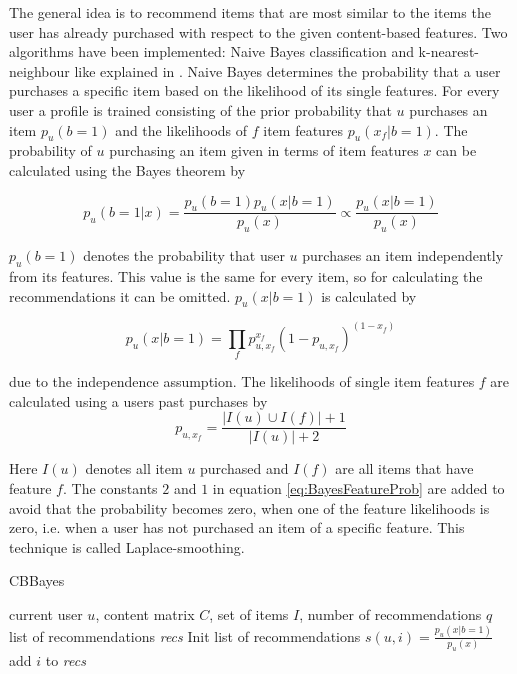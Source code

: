 \documentclass[10pt]{reportMaster}
\begin{document}
The general idea is to recommend items that are most similar to the items the user has already purchased with respect to the given content-based features.
Two algorithms have been implemented: Naive Bayes classification and k-nearest-neighbour like explained in \cite{contentbasedPazzani}.
Naive Bayes determines the probability that a user purchases a specific item based on the likelihood of its single features.
For every user a profile is trained consisting of the prior probability that $u$ purchases an item $p_u(b=1)$ and  the likelihoods of $f$ item features $p_u(x_f|b=1)$.
The probability of $u$ purchasing an item given in terms of item features $x$ can be calculated using the Bayes theorem by 

\begin{equation}
\label{BayesPost}
	p_u(b=1|x) = \frac{p_u(b=1) p_u(x|b=1)}{p_u(x)} \propto \frac{p_u(x|b=1)}{p_u(x)}
\end{equation}

$p_u(b=1)$ denotes the probability that user $u$ purchases an item independently from its features.
This value is the same for every item, so for calculating the recommendations it can be omitted.
$p_u(x|b=1)$ is calculated by 

\begin{equation}
\label{BayesEvid}
p_u(x|b=1) = \prod_f{p_{u, x_f}^{x_f}(1-p_{u, x_f})^{(1-x_f)}}
\end{equation}

due to the independence assumption.
The likelihoods of single item features $f$ are calculated using a users past purchases by
\begin{equation}
\label{eq:BayesFeatureProb}
p_{u, x_f} = \frac{|I(u) \cup I(f)|+1}{|I(u)|+2}
\end{equation}

Here $I(u)$ denotes all item $u$ purchased and $I(f)$ are all items that have feature $f$.
The constants $2$ and $1$ in equation \ref{eq:BayesFeatureProb} are added to avoid that the probability becomes zero, when one of the feature likelihoods is zero, i.e. when a user has not purchased an item of a specific feature.
This technique is called Laplace-smoothing.

\begin{algorithm}
	\caption{CBBayes}
	\label{alg:CBBayes}
	\begin{algorithmic}[1]
		\Require current user $u$, content matrix $C$, set of items $I$, number of recommendations $q$
		\Ensure list of recommendations \textit{recs}
		\State Init list of recommendations 
			\State 	$s(u,i) = \frac{p_u(x|b=1)}{p_u(x)}$
				\State add $i$ to \textit{recs}
			\EndIf
		\EndFor
	\end{algorithmic}	
\end{algorithm}
\end{document}
